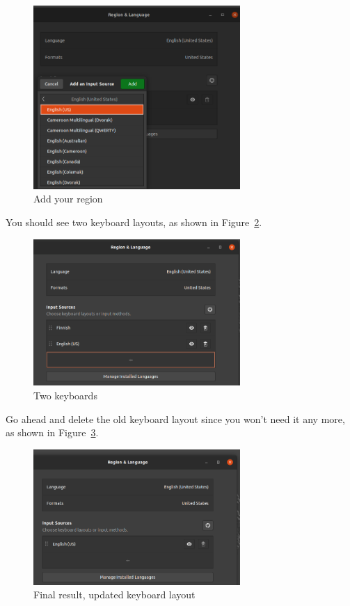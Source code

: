 \begin{figure}[H]
\begin{center}
\includegraphics[width=0.7\textwidth]{virt-11}
\caption{Add your region}\label{fg:virt-11}
\end{center}
\end{figure}

You should see two keyboard layouts, as shown in Figure~\ref{fg:virt-12}.

\begin{figure}[H]
\begin{center}
\includegraphics[width=0.7\textwidth]{virt-12}
\caption{Two keyboards}\label{fg:virt-12}
\end{center}
\end{figure}

Go ahead and delete the old keyboard layout since you won't need it any more, as shown in Figure~\ref{fg:virt-13}.

\begin{figure}[H]
\begin{center}
\includegraphics[width=0.7\textwidth]{virt-13}
\caption{Final result, updated keyboard layout}\label{fg:virt-13}
\end{center}
\end{figure}

